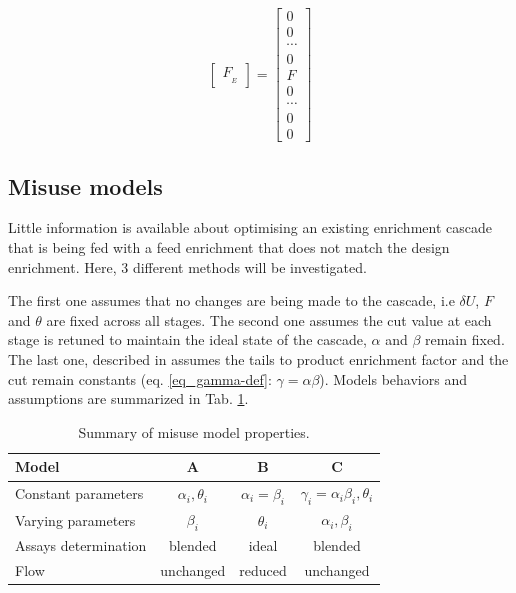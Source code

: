 \begin{equation}
\begin{bmatrix}
     F_{_{E}}
 \end{bmatrix}
 =
 \begin{bmatrix}
     0      \\
     0      \\
     \cdots \\
     0      \\
     F      \\
     0      \\
     \cdots \\
     0      \\
     0
\end{bmatrix}
\label{eq_flow}
\end{equation}



\subsection{Misuse models}

Little information is available about optimising an existing enrichment cascade
that is being fed with a feed enrichment that does not match the design
enrichment. Here, 3 different methods will be investigated.

The first one assumes that no changes are being made to the cascade, i.e $\delta
U$, $F$ and $\theta$ are fixed across all stages. The second one assumes the cut
value at each stage is retuned to maintain the ideal state of the cascade,
$\alpha$ and $\beta$ remain fixed. The last one, described in \cite{walker.2017}
assumes the tails to product enrichment factor and the cut remain constants
(eq. \eqref{eq_gamma-def}: $\gamma = \alpha\beta$). Models behaviors and
assumptions are summarized in Tab. \ref{tab:models}.

\begin{table}[htb]
\centering
  \caption{Summary of misuse model properties.}
\begin{tabular}{l|ccc}
\toprule

Model                &    A                 & B                  & C  \\
\midrule
Constant parameters  & $\alpha_i, \theta_i$ & $\alpha_i=\beta_i$ & $\gamma_i=\alpha_i\beta_i, \theta_i$       \\
Varying parameters   & $\beta_i$            & $\theta_i$         & $\alpha_i, \beta_i$                     \\
Assays determination & blended              & ideal              & blended                  \\
Flow                 & unchanged            & reduced            & unchanged       \\

\bottomrule
\end{tabular}
  \label{tab:models}
\end{table}

